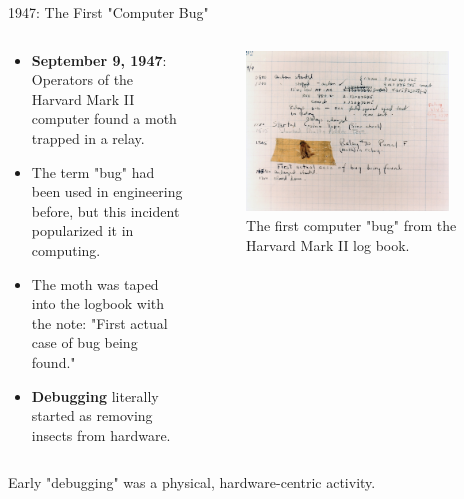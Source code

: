 \documentclass{beamer}
\begin{document}
\begin{frame}[t]{1947: The First "Computer Bug"}
\begin{columns}
    \begin{column}{0.5\textwidth}
        \begin{itemize}
            \item \textbf{September 9, 1947}: Operators of the Harvard Mark II computer found a moth trapped in a relay.
            \item The term "bug" had been used in engineering before, but this incident popularized it in computing.
            \item The moth was taped into the logbook with the note: "First actual case of bug being found."
            \item \textbf{Debugging} literally started as removing insects from hardware.
        \end{itemize}
    \end{column}
    \begin{column}{0.5\textwidth}
        \begin{figure}
        \begin{center}
            \includegraphics[width=0.9\textwidth]{images/first-computer-bug.jpg}
        \end{center}
        \caption{The first computer "bug" from the Harvard Mark II log book.}
        \label{fig:bug}
        \end{figure}
        
    \end{column}
\end{columns}
\begin{block}{}
Early "debugging" was a physical, hardware-centric activity.
\end{block}
\end{frame}
\end{document}
